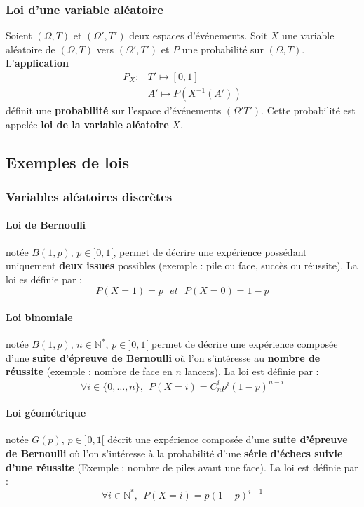 \documentclass[10pt,a4paper,twoside]{article}
\begin{document}
\subsubsection{Loi d'une variable aléatoire}

Soient $(\Omega,T)$ et $(\Omega',T')$ deux espaces d'événements. Soit $X$ une variable aléatoire de $(\Omega,T)$ vers $(\Omega',T')$ et $P$ une probabilité sur $(\Omega,T)$. L'\textbf{application}
\begin{align*}
P_{X}: & T'\longmapsto [0,1]\\
 & A'\longmapsto P(X^{-1}(A'))
\end{align*}
définit une \textbf{probabilité} sur l'espace d'événements $(\Omega'T')$. Cette probabilité est appelée \textbf{loi de la variable aléatoire} $X$.

\subsection{Exemples de lois}
\subsubsection{Variables aléatoires discrètes}
\paragraph{Loi de Bernoulli} notée $B(1,p)$, $p\in ]0,1[$, permet de décrire une expérience possédant uniquement \textbf{deux issues} possibles (exemple : pile ou face, succès ou réussite). La loi es définie par :
$$P(X=1)=p\ \ \ et\ \ \ P(X=0)=1-p$$

\paragraph{Loi binomiale} notée $B(1,p)$, $n\in \mathbb{N}^{*}$, $p\in ]0,1[$ permet de décrire une expérience composée d'une \textbf{suite d'épreuve de Bernoulli} où l'on s'intéresse au \textbf{nombre de réussite} (exemple : nombre de face en $n$ lancers). La loi est définie par :
$$\forall i\in \{0,\ldots,n\},\ \ P(X=i)=C_{n}^{i}p^{i}(1-p)^{n-i}$$

\paragraph{Loi géométrique} notée $G(p)$, $p\in ]0,1[$ décrit une expérience composée d'une \textbf{suite d'épreuve de Bernoulli} où l'on s'intéresse à la probabilité d'une \textbf{série d'échecs suivie d'une réussite} (Exemple : nombre de piles avant une face). La loi est définie par :
$$\forall i \in \mathbb{N}^{*},\ \ P(X=i)=p(1-p)^{i-1}$$
\end{document}
